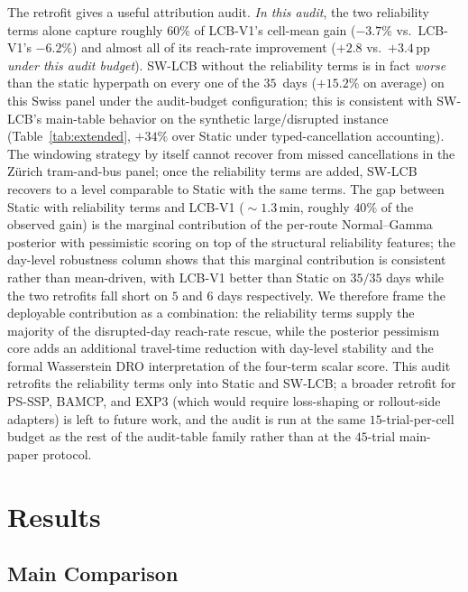 \documentclass[opre,dblanonrev]{informs4}
\begin{document}
The retrofit gives a useful attribution audit. \emph{In this
audit}, the two reliability terms alone capture roughly $60\%$ of
LCB-V1's cell-mean gain ($-3.7\%$ vs.\ LCB-V1's $-6.2\%$) and almost
all of its reach-rate improvement ($+2.8$ vs.\ $+3.4$\,pp
\emph{under this audit budget}). SW-LCB without the reliability terms
is in fact \emph{worse} than the static hyperpath on every one of
the $35$~days ($+15.2\%$ on average)
on this Swiss panel under the audit-budget configuration; this
is consistent with SW-LCB's main-table behavior on the synthetic
large/disrupted instance (Table~\ref{tab:extended}, $+34\%$ over
Static under typed-cancellation accounting). The windowing
strategy by itself cannot recover from missed cancellations in
the Z\"urich tram-and-bus panel; once the reliability terms are
added, SW-LCB recovers to a level comparable to Static with the same
terms. The gap between Static with reliability terms and LCB-V1
($\!\sim\!1.3$\,min, roughly $40\%$ of the observed gain) is the
marginal contribution of the per-route Normal--Gamma posterior
with pessimistic scoring on top of the structural reliability
features; the day-level robustness column shows that this
marginal contribution is consistent rather than mean-driven, with
LCB-V1 better than Static on $35/35$ days while the two retrofits
fall short on $5$ and $6$ days respectively. We therefore frame the
deployable contribution as a combination: the reliability terms
supply the majority of the disrupted-day reach-rate rescue, while
the posterior pessimism core adds an additional travel-time
reduction with day-level stability and the formal Wasserstein DRO
interpretation of the four-term scalar score.
This audit retrofits the reliability terms only into Static and SW-LCB; a broader
retrofit for PS-SSP, BAMCP, and EXP3 (which would require
loss-shaping or rollout-side adapters) is left to future work,
and the audit is run at the same $15$-trial-per-cell budget as
the rest of the audit-table family rather than at the
$45$-trial main-paper protocol.


\section{Results}
\label{sec:results}

\subsection{Main Comparison}
\end{document}
